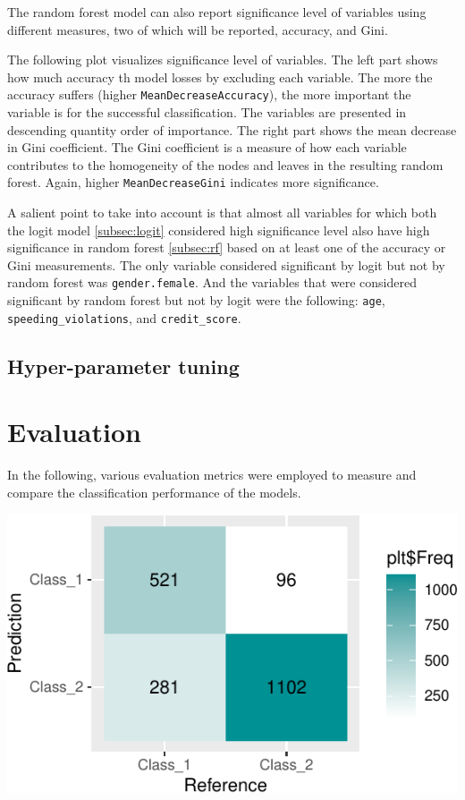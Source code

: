 \documentclass{article}
\begin{document}
The random forest model can also report significance level of variables
using different measures, two of which will be reported, accuracy, and
Gini.

The following plot visualizes significance level of variables. The left
part shows how much accuracy th model losses by excluding each variable.
The more the accuracy suffers (higher \texttt{MeanDecreaseAccuracy}),
the more important the variable is for the successful classification.
The variables are presented in descending quantity order of importance.
The right part shows the mean decrease in Gini coefficient. The Gini
coefficient is a measure of how each variable contributes to the
homogeneity of the nodes and leaves in the resulting random forest.
Again, higher \texttt{MeanDecreaseGini} indicates more significance.

A salient point to take into account is that almost all variables for
which both the logit model \ref{subsec:logit} considered high
significance level also have high significance in random forest
\ref{subsec:rf} based on at least one of the accuracy or Gini
measurements. The only variable considered significant by logit but not
by random forest was \texttt{gender.female}. And the variables that were
considered significant by random forest but not by logit were the
following: \texttt{age}, \texttt{speeding\_violations}, and
\texttt{credit\_score}.

\hypertarget{hyper-parameter-tuning}{%
\subsection{Hyper-parameter tuning}\label{hyper-parameter-tuning}}

\hypertarget{evaluation}{%
\section{\texorpdfstring{Evaluation
\label{sec:evaluation}}{Evaluation }}\label{evaluation}}

In the following, various evaluation metrics were employed to measure
and compare the classification performance of the models.

\includegraphics{report_files/figure-latex/unnamed-chunk-13-1.pdf}
\end{document}
